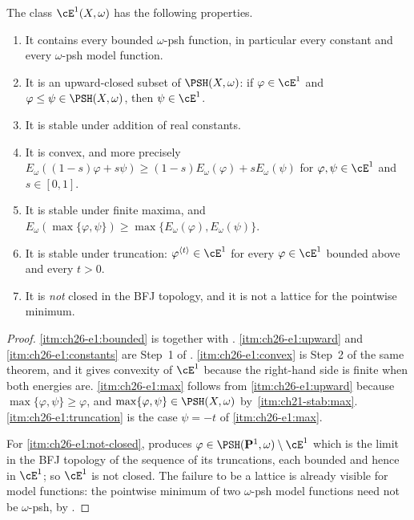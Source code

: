 \begin{theorem}
\label{thm:ch26-e1-structure}
The class \(\cE^1(X,\omega)\) has the following properties.
\begin{enumerate}
\item\label{itm:ch26-e1:bounded}
 It contains every bounded \(\omega\)-psh function, in particular every
 constant and every \(\omega\)-psh model function.
\item\label{itm:ch26-e1:upward}
 It is an upward-closed subset of \(\PSH(X,\omega)\): if
 \(\varphi\in\cE^1\) and \(\varphi\leq\psi\in\PSH(X,\omega)\), then
 \(\psi\in\cE^1\).
\item\label{itm:ch26-e1:constants}
 It is stable under addition of real constants.
\item\label{itm:ch26-e1:convex}
 It is convex, and more precisely
 \(E_\omega((1-s)\varphi+s\psi)\geq(1-s)E_\omega(\varphi)+sE_\omega(\psi)\)
 for \(\varphi,\psi\in\cE^1\) and \(s\in[0,1]\).
\item\label{itm:ch26-e1:max}
 It is stable under finite maxima, and
 \(E_\omega(\max\{\varphi,\psi\})\geq\max\{E_\omega(\varphi),E_\omega(\psi)\}\).
\item\label{itm:ch26-e1:truncation}
 It is stable under truncation: \(\varphi^{\langle t\rangle}\in\cE^1\) for
 every \(\varphi\in\cE^1\) bounded above and every \(t>0\).
\item\label{itm:ch26-e1:not-closed}
 It is \emph{not} closed in the BFJ topology, and it is not a lattice for the
 pointwise minimum.
\end{enumerate}
\end{theorem}

\begin{proof}
\cref{itm:ch26-e1:bounded} is  together with
.  \cref{itm:ch26-e1:upward} and
\cref{itm:ch26-e1:constants} are Step~1 of
.  \cref{itm:ch26-e1:convex} is Step~2 of the
same theorem, and it gives convexity of \(\cE^1\) because the right-hand side
is finite when both energies are.  \cref{itm:ch26-e1:max} follows from
\cref{itm:ch26-e1:upward} because \(\max\{\varphi,\psi\}\geq\varphi\), and
\(\max\{\varphi,\psi\}\in\PSH(X,\omega)\) by
\,\cref{itm:ch21-stab:max}.  \cref{itm:ch26-e1:truncation}
is the case \(\psi=-t\) of \cref{itm:ch26-e1:max}.

For \cref{itm:ch26-e1:not-closed},  produces
\(\varphi\in\PSH(\mathbf P^1,\omega)\setminus\cE^1\) which is the limit in
the BFJ topology of the sequence of its truncations, each bounded and hence
in \(\cE^1\); so \(\cE^1\) is not closed.  The failure to be a lattice is
already visible for model functions: the pointwise minimum of two
\(\omega\)-psh model functions need not be \(\omega\)-psh, by
.
\end{proof}

